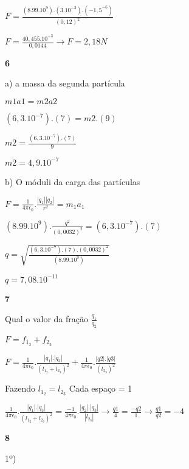 \documentclass{article}
\begin{document}
$F=\frac{(8.99.10^{9}).(3.10^{-3}).(-1,5^{-6})}{(0,12)^2}$\newline

$F=\frac{40,455.10^{-3} }{0,0144} \rightarrow F=2,18 N$\newline

\textbf{6}

a) a massa da segunda partícula 

$m1a1 = m2a2$\newline

$(6,3.10^{-7}).(7)=m2.(9)$\newline

$m2=\frac{(6,3.10^{-7}).(7)}{9}$\newline

$m2 = 4,9.10^{-7}$\newline

b) O móduli da carga das partículas


$F=\frac{1}{4\pi \epsilon _0}. \frac{|q_1| |q_2|}{r^2}= m_1a_1$\newline

$(8.99.10^{9}). \frac{q^2}{(0,0032)^2}=(6,3.10^{-7}).(7)$\newline

$q=\sqrt{\frac{(6,3.10^{-7}).(7).(0,0032)^2}{(8.99.10^{9})}}$\newline

$q=7,08.10^{-11}$\newline

\textbf{7}\newline

Qual o valor da fração $\frac{q_1}{q_2}$\newline

$F=f_1_3 + f_2_3$\newline

$F=\frac{1}{4\pi\epsilon_0}.\frac{|q_1|.|q_3|}{(l_1_2 + l_2_3)^2}+\frac{1}{4\pi\epsilon_0}.\frac{|q2|.|q3|}{(l_2_3)^2}$\newline

Fazendo $l_1_2 = l_2_3$ Cada espaço = 1\newline

$\frac{1}{4\pi\epsilon_0}.\frac{|q_1|.|q_3|}{(l_1_2 + l_2_3)^2} = \frac{-1}{4\pi\epsilon_0}.\frac{|q_2|.|q_3|}{|l_2_3|}\rightarrow \frac{q1}{4} = \frac{-q2}{1} \rightarrow \frac{q1}{q2} = -4$\newline

\textbf{8}\newline

1º)\newline
\end{document}
